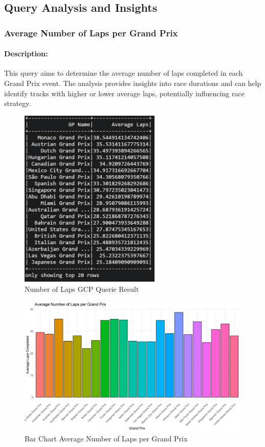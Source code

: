 \documentclass{article}
\begin{document}
\subsection{Query Analysis and Insights}

\subsubsection{Average Number of Laps per Grand Prix}
\paragraph{Description:}
This query aims to determine the average number of laps completed in each Grand Prix event. The analysis provides insights into race durations and can help identify tracks with higher or lower average laps, potentially influencing race strategy.

\begin{figure}[H]
    \centering
    \includegraphics[width=0.6\textwidth]{ss-average-laps.png}
    \caption{Number of Laps GCP Querie Result}
\end{figure}

\begin{figure}[H]
    \centering
    \includegraphics[width=\textwidth]{average_laps_per_gp_plot.png}
    \caption{Bar Chart Average Number of Laps per Grand Prix}
\end{figure}
\end{document}
